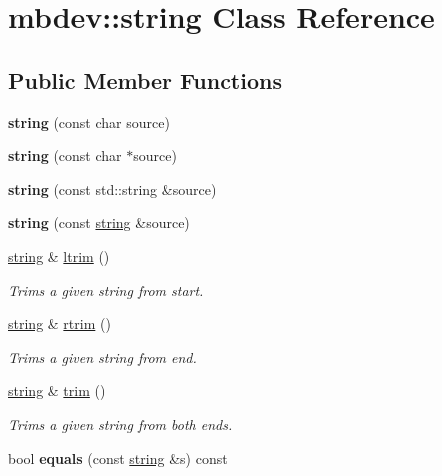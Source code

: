 \hypertarget{classmbdev_1_1string}{\section{mbdev\-:\-:string \-Class \-Reference}
\label{classmbdev_1_1string}
}
\subsection*{\-Public \-Member \-Functions}
\begin{DoxyCompactItemize}
\item 
\hypertarget{classmbdev_1_1string_a346dc571197f1e56d6bf0cfc1b717683}{{\bfseries string} (const char source)}\label{classmbdev_1_1string_a346dc571197f1e56d6bf0cfc1b717683}

\item 
\hypertarget{classmbdev_1_1string_a42a1cf2ce3836cc4f30f71a905173127}{{\bfseries string} (const char $\ast$source)}\label{classmbdev_1_1string_a42a1cf2ce3836cc4f30f71a905173127}

\item 
\hypertarget{classmbdev_1_1string_a9e8ea6a1421176521dae10ca21f157d9}{{\bfseries string} (const std\-::string \&source)}\label{classmbdev_1_1string_a9e8ea6a1421176521dae10ca21f157d9}

\item 
\hypertarget{classmbdev_1_1string_a41cc2cfdacaa7d2db1e85cc1b5119422}{{\bfseries string} (const \hyperlink{classmbdev_1_1string}{string} \&source)}\label{classmbdev_1_1string_a41cc2cfdacaa7d2db1e85cc1b5119422}

\item 
\hyperlink{classmbdev_1_1string}{string} \& \hyperlink{classmbdev_1_1string_ab673feed85f4b0a582ba7c0797ef99a9}{ltrim} ()
\begin{DoxyCompactList}\small\item\em \-Trims a given string from start. \end{DoxyCompactList}\item 
\hyperlink{classmbdev_1_1string}{string} \& \hyperlink{classmbdev_1_1string_acd0647d477fc2fd71cf4902423075000}{rtrim} ()
\begin{DoxyCompactList}\small\item\em \-Trims a given string from end. \end{DoxyCompactList}\item 
\hyperlink{classmbdev_1_1string}{string} \& \hyperlink{classmbdev_1_1string_a5f8b27d5a309c9c5acb58e741b046438}{trim} ()
\begin{DoxyCompactList}\small\item\em \-Trims a given string from both ends. \end{DoxyCompactList}\item 
\hypertarget{classmbdev_1_1string_a16d301549852cd8beb980f04ae4575f4}{bool {\bfseries equals} (const \hyperlink{classmbdev_1_1string}{string} \&s) const }\label{classmbdev_1_1string_a16d301549852cd8beb980f04ae4575f4}


\end{DoxyCompactItemize}
